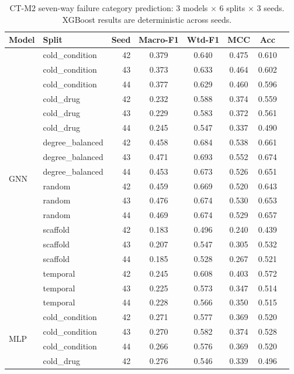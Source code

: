 \begin{table}[h]
\centering
\caption{CT-M2 seven-way failure category prediction: 3 models $\times$ 6 splits $\times$ 3 seeds. XGBoost results are deterministic across seeds.}
\label{tab:ct_m2_full}
\scriptsize
\begin{tabular}{@{}llrccccc@{}}
\toprule
\textbf{Model} & \textbf{Split} & \textbf{Seed} & \textbf{Macro-F1} & \textbf{Wtd-F1} & \textbf{MCC} & \textbf{Acc} \\
\midrule
\multirow{18}{*}{GNN}
& cold\_condition & 42 & 0.379 & 0.640 & 0.475 & 0.610 \\
& cold\_condition & 43 & 0.373 & 0.633 & 0.464 & 0.602 \\
& cold\_condition & 44 & 0.377 & 0.629 & 0.460 & 0.596 \\
& cold\_drug & 42 & 0.232 & 0.588 & 0.374 & 0.559 \\
& cold\_drug & 43 & 0.229 & 0.583 & 0.372 & 0.561 \\
& cold\_drug & 44 & 0.245 & 0.547 & 0.337 & 0.490 \\
& degree\_balanced & 42 & 0.458 & 0.684 & 0.538 & 0.661 \\
& degree\_balanced & 43 & 0.471 & 0.693 & 0.552 & 0.674 \\
& degree\_balanced & 44 & 0.453 & 0.673 & 0.526 & 0.651 \\
& random & 42 & 0.459 & 0.669 & 0.520 & 0.643 \\
& random & 43 & 0.476 & 0.674 & 0.530 & 0.653 \\
& random & 44 & 0.469 & 0.674 & 0.529 & 0.657 \\
& scaffold & 42 & 0.183 & 0.496 & 0.240 & 0.439 \\
& scaffold & 43 & 0.207 & 0.547 & 0.305 & 0.532 \\
& scaffold & 44 & 0.185 & 0.528 & 0.267 & 0.521 \\
& temporal & 42 & 0.245 & 0.608 & 0.403 & 0.572 \\
& temporal & 43 & 0.225 & 0.573 & 0.347 & 0.514 \\
& temporal & 44 & 0.228 & 0.566 & 0.350 & 0.515 \\
\midrule
\multirow{18}{*}{MLP}
& cold\_condition & 42 & 0.271 & 0.577 & 0.369 & 0.520 \\
& cold\_condition & 43 & 0.270 & 0.582 & 0.374 & 0.528 \\
& cold\_condition & 44 & 0.266 & 0.576 & 0.369 & 0.520 \\
& cold\_drug & 42 & 0.276 & 0.546 & 0.339 & 0.496 \\

\end{tabular}
\end{table}
